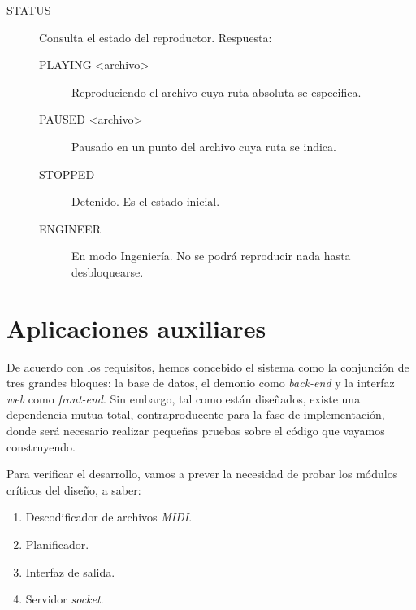 \begin{description}
	\item[STATUS] Consulta el estado del reproductor. Respuesta:
	
	\begin{description}
		\item[PLAYING <archivo>] Reproduciendo el archivo cuya ruta absoluta se especifica.
		\item[PAUSED <archivo>] Pausado en un punto del archivo cuya ruta se indica.
		\item[STOPPED] Detenido. Es el estado inicial.
		\item[ENGINEER] En modo Ingeniería. No se podrá reproducir nada hasta desbloquearse.
	\end{description}
	
\end{description}

\section{Aplicaciones auxiliares}

De acuerdo con los requisitos, hemos concebido el sistema como la conjunción de tres grandes bloques: la base de datos, el demonio como \textit{back-end} y la interfaz \textit{web} como \textit{front-end}. Sin embargo, tal como están diseñados, existe una dependencia mutua total, contraproducente para la fase de implementación, donde será necesario realizar pequeñas pruebas sobre el código que vayamos construyendo.

Para verificar el desarrollo, vamos a prever la necesidad de probar los módulos críticos del diseño, a saber:

\begin{enumerate}
	\item Descodificador de archivos \textit{MIDI}.
	\item Planificador.
	\item Interfaz de salida.
	\item Servidor \textit{socket}.
\end{enumerate}

\smallskip

